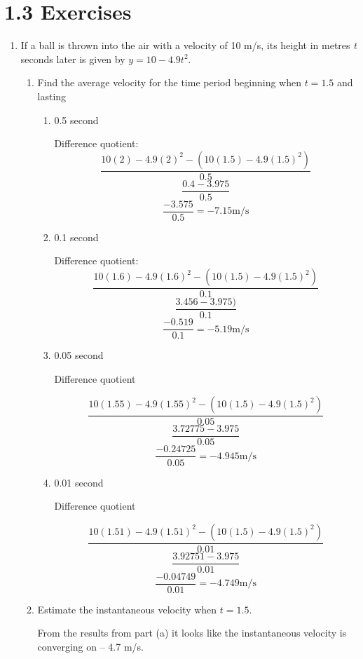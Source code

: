 \documentclass{article}
\begin{document}
	\section{1.3 Exercises}
	
	\begin{enumerate}
		\item If a ball is thrown into the air with a velocity of 10 m/s, its height in metres
			\emph{t} seconds later is given by $y = 10 - 4.9t^2$.
			
			\begin{enumerate}
				\item Find the average velocity for the time period beginning when $t = 1.5$ and
					lasting
				\begin{enumerate}
					\item 0.5 second
					
					Difference quotient:
					$$\frac{10(2) - 4.9(2)^2 - (10(1.5) - 4.9(1.5)^2)}{0.5}$$
					$$\frac{0.4 - 3.975}{0.5}$$
					$$\frac{-3.575}{0.5} = -7.15 \text{m/s}$$
					
					\item 0.1 second
					
					Difference quotient:
					$$\frac{10(1.6) - 4.9(1.6)^2 - (10(1.5) - 4.9(1.5)^2)}{0.1}$$
					$$\frac{3.456 - 3.975)}{0.1}$$
					$$\frac{-0.519}{0.1} = -5.19 \text{m/s}$$
					
					\item 0.05 second
					
					Difference quotient
					
					$$\frac{10(1.55) - 4.9(1.55)^2 -  (10(1.5) - 4.9(1.5)^2)}{0.05}$$
					$$\frac{ 3.72775 - 3.975}{0.05}$$
					$$\frac{ -0.24725}{0.05} = - 4.945 \text{m/s}$$
					
					\item 0.01 second
					
					Difference quotient
					
					$$\frac{10(1.51) - 4.9(1.51)^2 -  (10(1.5) - 4.9(1.5)^2)}{0.01}$$
					$$\frac{ 3.92751 - 3.975 }{0.01}$$
					$$\frac{ -0.04749}{0.01} = - 4.749\text{m/s}$$					
					
				\end{enumerate}
				\item Estimate the instantaneous velocity when $t = 1.5$.
				
					From the results from part (a) it looks like the instantaneous velocity is converging on -- 4.7 m/s.
				
				
			\end{enumerate}
			

\end{enumerate}
\end{document}
